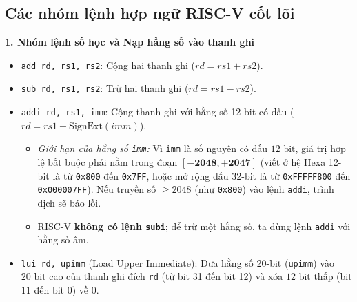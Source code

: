 \begin{center}
\end{center}

\subsection{Các nhóm lệnh hợp ngữ RISC-V cốt lõi}

\textbf{1. Nhóm lệnh số học và Nạp hằng số vào thanh ghi}
\begin{itemize}
    \item \texttt{add rd, rs1, rs2}: Cộng hai thanh ghi ($rd = rs1 + rs2$).
    \item \texttt{sub rd, rs1, rs2}: Trừ hai thanh ghi ($rd = rs1 - rs2$).
    \item \texttt{addi rd, rs1, imm}: Cộng thanh ghi với hằng số 12-bit có dấu ($rd = rs1 + \text{SignExt}(imm)$).
    \begin{itemize}
        \item \textit{Giới hạn của hằng số \texttt{imm}:} Vì \texttt{imm} là số nguyên có dấu $12\text{ bit}$, giá trị hợp lệ bắt buộc phải nằm trong đoạn $[\mathbf{-2048, +2047}]$ (viết ở hệ Hexa 12-bit là từ \texttt{0x800} đến \texttt{0x7FF}, hoặc mở rộng dấu 32-bit là từ \texttt{0xFFFFF800} đến \texttt{0x000007FF}). Nếu truyền số $\ge 2048$ (như \texttt{0x800}) vào lệnh \texttt{addi}, trình dịch sẽ báo lỗi.
        \item RISC-V \textbf{không có lệnh \texttt{subi}}; để trừ một hằng số, ta dùng lệnh \texttt{addi} với hằng số âm.
    \end{itemize}
    \item \texttt{lui rd, upimm} (Load Upper Immediate): Đưa hằng số 20-bit (\texttt{upimm}) vào $20\text{ bit}$ cao của thanh ghi đích \texttt{rd} (từ bit 31 đến bit 12) và xóa $12\text{ bit}$ thấp (bit 11 đến bit 0) về $0$.
\end{itemize}

